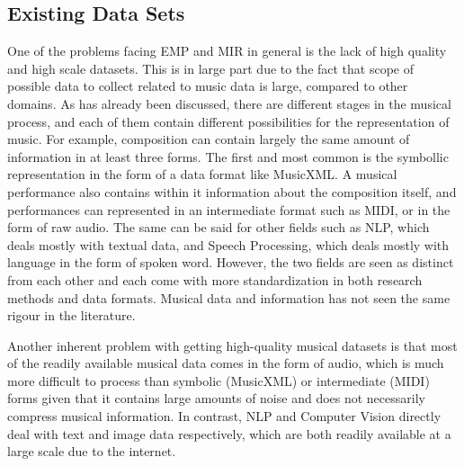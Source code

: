 \subsection{Existing Data Sets}
One of the problems facing EMP and MIR in general is the lack of high quality and high scale datasets\cite{cancino2018computational}. This is in large part due to the fact that scope of possible data to collect related to music data is large, compared to other domains. As has already been discussed, there are different stages in the musical process, and each of them contain different possibilities for the representation of music. For example, composition can contain largely the same amount of information in at least three forms. The first and most common is the symbollic representation in the form of a data format like MusicXML. A musical performance also contains within it information about the composition itself, and performances can represented in an intermediate format such as MIDI, or in the form of raw audio. The same can be said for other fields such as NLP, which deals mostly with textual data, and Speech Processing, which deals mostly with language in the form of spoken word. However, the two fields are seen as distinct from each other and each come with more standardization in both research methods and data formats. Musical data and information has not seen the same rigour in the literature. 

Another inherent problem with getting high-quality musical datasets is that most of the readily available musical data comes in the form of audio, which is much more difficult to process than symbolic (MusicXML) or intermediate (MIDI) forms given that it contains large amounts of noise and does not necessarily compress musical information. In contrast, NLP and Computer Vision directly deal with text and image data respectively, which are both readily available at a large scale due to the internet. 

